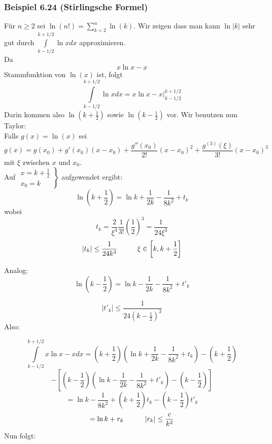 \subsubsection*{Beispiel 6.24 (Stirlingsche Formel)}
Für $n\geq 2$ sei $\ln (n!) = \sum\limits_{k = 2}^n {\ln (k)} $. Wir zeigen dass man kann $\ln\left| k\right|$ sehr gut durch $\int\limits_{k - 1/2}^{k + 1/2} {\ln xdx} $ approximieren.\\

\noindent Da $$x\ln x-x$$ Stammfunktion von $\ln(x)$ ist, folgt $$\int\limits_{k - 1/2}^{k + 1/2} {\ln xdx}  = \left. {x\ln x - x} \right|_{k - 1/2}^{k + 1/2}$$ Darin kommen also $\ln\left(k+\frac{1}{2}\right)$ sowie $\ln\left(k-\frac{1}{2}\right)$ vor. Wir benutzen nun Taylor:\\

\noindent Falls $g(x)=\ln(x)$ sei $$g(x)=g(x_0)+g'(x_0)(x-x_0)+\frac{g''(x_0)}{2!}(x-x_0)^2+\frac{g^{(3)}(\xi)}{3!}(x-x_0)^3$$ mit $\xi$ zwischen $x$ und $x_0$.\\

\noindent Auf $\left. {\begin{array}{*{20}{c}}
{x = k + \frac{1}{2}}\\
{{x_0} = k}
\end{array}} \right\}$ aufgewendet ergibt:
\[\ln \left( {k + \frac{1}{2}} \right) = \ln k + \frac{1}{{2k}} - \frac{1}{{8{k^2}}} + {t_k}\]
wobei $${t_k} = \frac{2}{{{\xi ^3}}}\frac{1}{{3!}}{\left( {\frac{1}{2}} \right)^3} = \frac{1}{{24{\xi ^3}}}$$
\[\left| {{t_k}} \right| \le \frac{1}{{24{k^3}}}\text{\hspace{10mm}}\xi  \in \left[ {k,k + \frac{1}{2}} \right]\]

\noindent Analog:
\[\ln \left( {k - \frac{1}{2}} \right) = \ln k - \frac{1}{{2k}} - \frac{1}{{8{k^2}}} + {t'_k}\]

\[\left| {{t'_k}} \right| \le \frac{1}{{24{\left(k-\frac{1}{2}\right)^3}}}\]
Also:

\[\int\limits_{k - 1/2}^{k + 1/2} {x\ln x - xdx = \left( {k + \frac{1}{2}} \right)} \left( {\ln k + \frac{1}{{2k}} - \frac{1}{{8{k^2}}} + {t_k}} \right) - \left( {k + \frac{1}{2}} \right)\]
$$ - \left[ {\left( {k - \frac{1}{2}} \right)\left( {\ln k - \frac{1}{{2k}} - \frac{1}{{8{k^2}}} + t{'_k}} \right) - \left( {k - \frac{1}{2}} \right)} \right]$$
$$ = \ln k - \frac{1}{{8{k^2}}} + \left( {k + \frac{1}{2}} \right){t_k} - \left( {k - \frac{1}{2}} \right)t{'_k}$$
$$ = \ln k + {r_k}\text{\hspace{10mm}}\left| {{r_k}} \right| \le \frac{c}{{{k^2}}}$$
\noindent Nun folgt:

